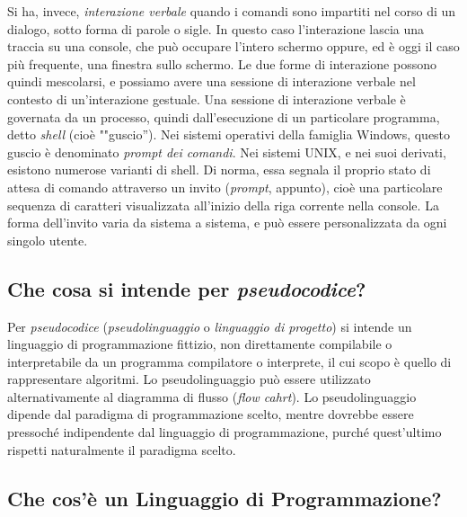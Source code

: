 Si ha, invece, \emph{interazione verbale} quando i comandi sono impartiti nel corso di un dialogo, sotto forma di parole o sigle. In questo caso l'interazione lascia una traccia su una console, che può occupare l'intero schermo oppure, ed è oggi il caso più frequente, una finestra sullo schermo. Le due forme di interazione possono quindi mescolarsi, e possiamo avere una sessione di interazione verbale nel contesto di un'interazione gestuale. Una  sessione di interazione verbale è governata da un processo, quindi dall'esecuzione di un particolare programma, detto \emph{shell} (cioè ""guscio''). Nei sistemi operativi della famiglia Windows, questo guscio è denominato \emph{prompt dei comandi}. Nei sistemi UNIX, e nei suoi derivati, esistono numerose varianti di shell. Di norma, essa segnala il proprio stato di attesa di comando attraverso un invito (\emph{prompt}, appunto), cioè una particolare sequenza di caratteri visualizzata all'inizio della riga corrente nella console. La forma dell'invito varia da sistema a sistema, e può essere personalizzata da ogni singolo utente.


	\subsection{Che cosa si intende per \emph{pseudocodice}?}
	\label{sub:pseudo}
Per \emph{pseudocodice} (\emph{pseudolinguaggio} o \emph{linguaggio di progetto}) si intende un linguaggio di programmazione fittizio, non direttamente compilabile o interpretabile da un programma compilatore o interprete, il cui scopo è quello di rappresentare algoritmi. Lo pseudolinguaggio può essere utilizzato alternativamente al diagramma di flusso (\emph{flow cahrt}). Lo pseudolinguaggio dipende dal paradigma di programmazione scelto, mentre dovrebbe essere pressoché indipendente dal linguaggio di programmazione, purché quest'ultimo rispetti naturalmente il paradigma scelto.

	\subsection[Cosa si intende per Linguaggio di Programmazione?]{Che cos'è un Linguaggio di Programmazione?}
	\label{subsec:programmazione}

